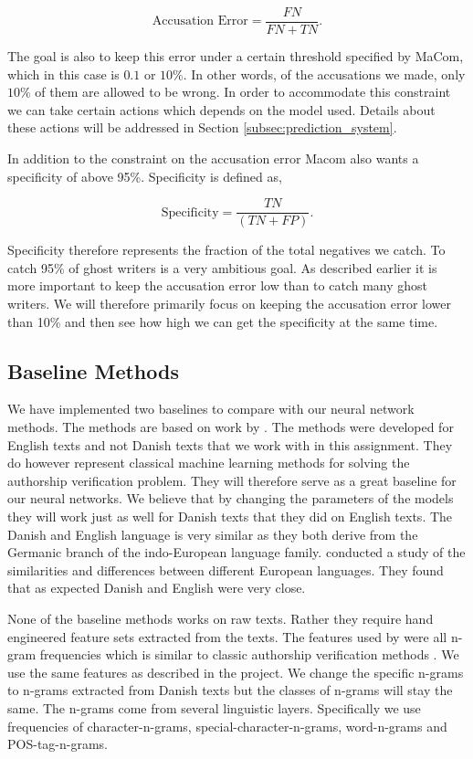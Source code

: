 \begin{equation}
    \text{Accusation Error} = \frac{FN}{FN + TN}.
\end{equation}

The goal is also to keep this error under a certain threshold specified
by MaCom, which in this case is $0.1$ or $10\%$. In other words, of the
accusations we made, only $10\%$ of them are allowed to be wrong. In order
to accommodate this constraint we can take certain actions which depends on
the model used. Details about these actions will be addressed in Section
\ref{subsec:prediction_system}.

In addition to the constraint on the accusation error Macom also wants a
specificity of above 95\%. Specificity is defined as,

\begin{equation}
    \text{Specificity} = \frac{TN}{(TN + FP)}.
\end{equation}

Specificity therefore represents the fraction of the total negatives we catch.
To catch 95\% of ghost writers is a very ambitious goal. As described earlier it
is more important to keep the accusation error low than to catch many ghost
writers. We will therefore primarily focus on keeping the accusation error lower
than 10\% and then see how high we can get the specificity at the same time.

\subsection{Baseline Methods}

We have implemented two baselines to compare with our neural network methods.
The methods are based on work by \citep{US}. The methods were developed for
English texts and not Danish texts that we work with in this assignment. They do
however represent classical machine learning methods for solving the authorship
verification problem. They will therefore serve as a great baseline for our
neural networks. We believe that by changing the parameters of the models
they will work just as well for Danish texts that they did on English texts.
The Danish and English language is very similar as they both derive from the
Germanic branch of the indo-European language family. \citet{konstantin:2000}
conducted a study of the similarities and differences between different European
languages. They found that as expected Danish and English were very close.

None of the baseline methods works on raw texts. Rather they require hand
engineered feature sets extracted from the texts. The features used by
\citet{US} were all n-gram frequencies which is similar to classic authorship
verification methods \citep{stamatos2009}. We use the same features as described
in the project. We change the specific n-grams to n-grams extracted from Danish
texts but the classes of n-grams will stay the same. The n-grams come from
several linguistic layers. Specifically we use frequencies of character-n-grams,
special-character-n-grams, word-n-grams and \gls{POS}-tag-n-grams.


